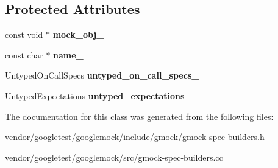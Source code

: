 \subsection*{Protected Attributes}
\begin{DoxyCompactItemize}
\item 
\mbox{\label{classtesting_1_1internal_1_1_untyped_function_mocker_base_adf35c589969bb985668616031cb9ed56}} 
const void $\ast$ {\bfseries mock\+\_\+obj\+\_\+}
\item 
\mbox{\label{classtesting_1_1internal_1_1_untyped_function_mocker_base_a2d472077b9a8d3758caaec5770259f70}} 
const char $\ast$ {\bfseries name\+\_\+}
\item 
\mbox{\label{classtesting_1_1internal_1_1_untyped_function_mocker_base_aed2a1913f6c03fd47c8900039556be34}} 
Untyped\+On\+Call\+Specs {\bfseries untyped\+\_\+on\+\_\+call\+\_\+specs\+\_\+}
\item 
\mbox{\label{classtesting_1_1internal_1_1_untyped_function_mocker_base_aae4a42a4bace1fcb0cd4bdf1ddd40277}} 
Untyped\+Expectations {\bfseries untyped\+\_\+expectations\+\_\+}
\end{DoxyCompactItemize}


The documentation for this class was generated from the following files\+:\begin{DoxyCompactItemize}
\item 
vendor/googletest/googlemock/include/gmock/gmock-\/spec-\/builders.\+h\item 
vendor/googletest/googlemock/src/gmock-\/spec-\/builders.\+cc\end{DoxyCompactItemize}
